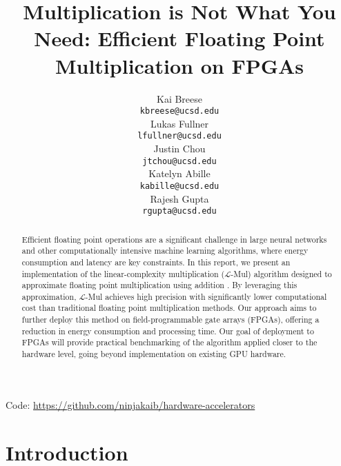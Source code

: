 \documentclass[12pt,letterpaper]{article}
\title{Multiplication is Not What You Need: Efficient Floating Point Multiplication on FPGAs}
\author{Kai Breese \\
  {\tt kbreese@ucsd.edu} \\\And
  Lukas Fullner \\
  {\tt lfullner@ucsd.edu} \\\And
  Justin Chou \\
  {\tt jtchou@ucsd.edu} \\\And
  Katelyn Abille \\
  {\tt kabille@ucsd.edu} \\\And
  Rajesh Gupta \\
  {\tt rgupta@ucsd.edu} \\}
\newcommand{\lmul}{$\mathcal{L}$-Mul\xspace}
\begin{document}
\maketitle


\begin{abstract}
    Efficient floating point operations are a significant challenge in large neural networks and other computationally intensive machine learning algorithms, where energy consumption and latency are key constraints. In this report, we present an implementation of the linear-complexity multiplication (\lmul) algorithm designed to approximate floating point multiplication using addition \citep{luo2024addition}. By leveraging this approximation, \lmul achieves high precision with significantly lower computational cost than traditional floating point multiplication methods. Our approach aims to further deploy this method on field-programmable gate arrays (FPGAs), offering a reduction in energy consumption and processing time. Our goal of deployment to FPGAs will provide practical benchmarking of the algorithm applied closer to the hardware level, going beyond implementation on existing GPU hardware.
\end{abstract}

\begin{center}
Code: \url{https://github.com/ninjakaib/hardware-accelerators}
\end{center}

\maketoc
\clearpage


\section{Introduction}
\end{document}
